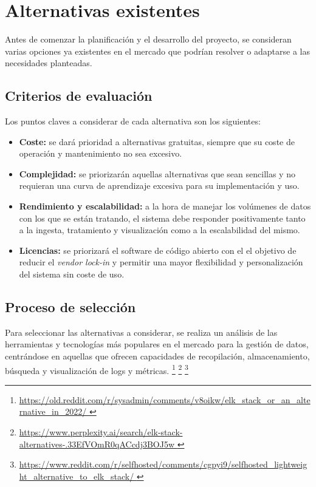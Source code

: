 \section{Alternativas existentes}\label{sec:alternativas}
Antes de comenzar la planificación y el desarrollo del proyecto, se consideran
varias opciones ya existentes en el mercado que podrían resolver o adaptarse a
las necesidades planteadas.


\subsection{Criterios de evaluación}
Los puntos claves a considerar de cada alternativa son los siguientes:

\begin{itemize}
	\item \textbf{Coste:} se dará prioridad a alternativas gratuitas, siempre
		que su coste de operación y mantenimiento no sea excesivo.
	\item \textbf{Complejidad:} se priorizarán aquellas alternativas que
		sean sencillas y no requieran una curva de aprendizaje excesiva para
		su implementación y uso.
	\item \textbf{Rendimiento y escalabilidad:} a la hora de manejar los
		volúmenes de datos con los que se están tratando, el sistema debe
		responder positivamente tanto a la ingesta, tratamiento y visualización
		como a la escalabilidad del mismo.
	\item \textbf{Licencias:} se priorizará el software de código abierto con el
		el objetivo de reducir el \textit{vendor lock-in} y permitir una mayor
		flexibilidad y personalización del sistema sin coste de uso.
\end{itemize}


\subsection{Proceso de selección}
Para seleccionar las alternativas a considerar, se realiza un análisis de las
herramientas y tecnologías más populares en el mercado para la gestión de datos,
centrándose en aquellas que ofrecen capacidades de recopilación, almacenamiento,
búsqueda y visualización de logs y métricas. \footnote{\url{
	https://old.reddit.com/r/sysadmin/comments/v8oikw/elk_stack_or_an_alternative_in_2022/
}}
\footnote{\url{
	https://www.perplexity.ai/search/elk-stack-alternatives-.33EfVOmR0qACcdj3BOJ5w
}}
\footnote{\url{
	https://www.reddit.com/r/selfhosted/comments/cgpyi9/selfhosted_lightweight_alternative_to_elk_stack/
}}

